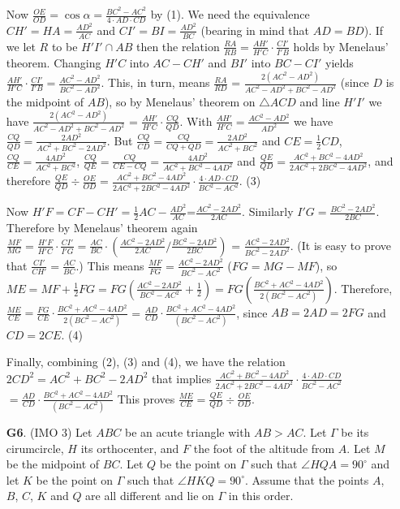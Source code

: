 \documentclass[11pt,a4paper]{article}
\begin{document}
\begin{enumerate}
Now $\frac {OE}{OD}=\cos\alpha =\frac{BC^2-AC^2}{4\cdot AD\cdot CD}$ by (1). We need the equivalence $CH'=HA=\frac{AD^2}{AC}$ and $CI'=BI=\frac{AD^2}{BC}$ (bearing in mind that $AD=BD$). If we let $R$ to be $H'I'\cap AB$ then the relation $\frac{RA}{RB}=\frac{AH'}{H'C}\cdot \frac{CI'}{I'B}$ holds by Menelaus' theorem. Changing $H'C$ into $AC-CH'$ and $BI'$ into $BC-CI'$ yields $\frac{AH'}{H'C}\cdot \frac{CI'}{I'B}=\frac{AC^2-AD^2}{BC^2-AD^2}.$ This, in turn, means $\frac{RA}{RD}$ = $\frac{2(AC^2-AD^2)}{AC^2-AD^2+BC^2-AD^2}$ (since $D$ is the midpoint of $AB$), so by Menelaus' theorem on $\triangle ACD$ and line $H'I'$ we have $\frac{2(AC^2-AD^2)}{AC^2-AD^2+BC^2-AD^2}$ = $\frac{AH'}{H'C}\cdot \frac{CQ}{QD}$. With $\frac{AH'}{H'C}=\frac{AC^2-AD^2}{AD^2}$ we have $\frac{CQ}{QD}=\frac{2AD^2}{AC^2+BC^2-2AD^2}.$ But $\frac{CQ}{CD}=\frac{CQ}{CQ+QD}=\frac{2AD^2}{AC^2+BC^2}$ and $CE=\frac12 CD$, $\frac{CQ}{CE}=\frac{4AD^2}{AC^2+BC^2}$, $\frac{CQ}{QE}=\frac{CQ}{CE-CQ}=\frac{4AD^2}{AC^2+BC^2-4AD^2}$ and $\frac{QE}{QD}=\frac{AC^2+BC^2-4AD^2}{2AC^2+2BC^2-4AD^2}$, and therefore $\frac {QE}{QD}\div \frac{OE}{OD}=\frac{AC^2+BC^2-4AD^2}{2AC^2+2BC^2-4AD^2}\cdot \frac{4\cdot AD\cdot CD}{BC^2-AC^2}.$  (3)

Now $H'F=CF-CH'=\frac12 AC-\frac{AD^2}{AC}$=$\frac{AC^2-2AD^2}{2AC}.$ Similarly $I'G=\frac{BC^2-2AD^2}{2BC}$. Therefore by Menelaus' theorem again $\frac{MF}{MG}=\frac{H'F}{H'C}\cdot \frac{CI'}{I'G}=\frac{AC}{BC}\cdot (\frac{AC^2-2AD^2}{2AC}/\frac{BC^2-2AD^2}{2BC})$ = $\frac{AC^2-2AD^2}{BC^2-2AD^2}.$ (It is easy to prove that $\frac{CI'}{CH'}=\frac{AC}{BC}$.) This means $\frac{MF}{FG}=\frac{AC^2-2AD^2}{BC^2-AC^2}$ ($FG=MG-MF$), so $ME=MF+\frac12 FG=FG(\frac{AC^2-2AD^2}{BC^2-AC^2}+\frac12)=FG(\frac{BC^2+AC^2-4AD^2}{2(BC^2-AC^2)})$. Therefore, $\frac{ME}{CE}=\frac{FG}{CE}\cdot \frac{BC^2+AC^2-4AD^2}{2(BC^2-AC^2)}$ = $\frac{AD}{CD}\cdot \frac{BC^2+AC^2-4AD^2}{(BC^2-AC^2)}$, since $AB=2AD=2FG$ and $CD=2CE$. (4)

Finally, combining (2), (3) and (4), we have the relation $2CD^2=AC^2+BC^2-2AD^2$ that implies 
$\frac{AC^2+BC^2-4AD^2}{2AC^2+2BC^2-4AD^2}\cdot \frac{4\cdot AD\cdot CD}{BC^2-AC^2}$
$=\frac{AD}{CD}\cdot \frac{BC^2+AC^2-4AD^2}{(BC^2-AC^2)}$
This proves 
$\frac {ME}{CE}=\frac {QE}{QD}\div \frac{OE}{OD}.$

\item[\textbf{G6}.] (IMO 3) Let $ABC$ be an acute triangle with $AB > AC$. Let $\Gamma $ be its cirumcircle, $H$ its orthocenter, and $F$ the foot of the altitude from $A$. Let $M$ be the midpoint of $BC$. Let $Q$ be the point on $\Gamma$ such that $\angle HQA = 90^{\circ}$ and let $K$ be the point on $\Gamma$ such that $\angle HKQ = 90^{\circ}$. Assume that the points $A$, $B$, $C$, $K$ and $Q$ are all different and lie on $\Gamma$ in this order.


\end{enumerate}
\end{document}
